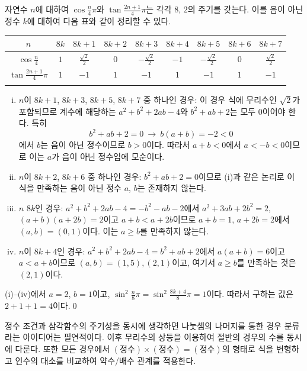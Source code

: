 \documentclass{article}
\begin{document}
\begin{sol}
	자연수 $n$에 대하여 $\cos\frac{n}{4}\pi$와 $\tan\frac{2n+1}{4}\pi$는 각각 $8$, $2$의 주기를 갖는다. 이를 음이 아닌 정수 $k$에 대하여 다음 표와 같이 정리할 수 있다.
	\begin{table}[H]
		\centering
		\begin{tabular}{c|cccccccc}
			\toprule
			$n$ & $8k$ & $8k+1$ & $8k+2$ & $8k+3$ & $8k+4$ & $8k+5$ & $8k+6$ & $8k+7$ \\ 
			\midrule
			$\cos\frac{n}{4}$ & $1$ & $\frac{\sqrt2}{2}$ & $0$ & $-\frac{\sqrt2}{2}$ & $-1$ & $-\frac{\sqrt2}{2}$ & $0$ & $\frac{\sqrt2}{2}$ \\ \addlinespace[3pt]
			\midrule
			$\tan\frac{2n+1}{4}\pi$ & $1$ & $-1$ & $1$ & $-1$ & $1$ & $-1$ & $1$ & $-1$ \\ \addlinespace[3pt]
			\bottomrule
		\end{tabular}
	\end{table}
	\begin{enumerate}[(i)]
		\item $n$이 $8k+1$, $8k+3$, $8k+5$, $8k+7$ 중 하나인 경우: 이 경우 식에 무리수인 $\sqrt2$가 포함되므로 계수에 해당하는 $a^2+b^2+2ab-4$와 $b^2+ab+2$는 모두 $0$이어야 한다. 특히
			\[
				b^2+ab+2=0~\longrightarrow~b(a+b)=-2<0
			\]
			에서 $b$는 음이 아닌 정수이므로 $b>0$이다. 따라서 $a+b<0$에서 $a<-b<0$이므로 이는 $a$가 음이 아닌 정수임에 모순이다.
		\item $n$이 $8k+2$, $8k+6$ 중 하나인 경우: $b^2+ab+2=0$이므로 (i)과 같은 논리로 이 식을 만족하는 음이 아닌 정수 $a$, $b$는 존재하지 않는다.
		\item $n$ $8k$인 경우: $a^2+b^2+2ab-4=-b^2-ab-2$에서 $a^2+3ab+2b^2=2$, $(a+b)(a+2b)=2$이고 $a+b<a+2b$이므로 $a+b=1$, $a+2b=2$에서 $(a,b)=(0,1)$이다. 이는 $a\geq b$를 만족하지 않는다.
		\item $n$이 $8k+4$인 경우: $a^2+b^2+2ab-4=b^2+ab+2$에서 $a(a+b)=6$이고 $a<a+b$이므로 $(a,b)=(1,5),(2,1)$이고, 여기서 $a\geq b$를 만족하는 것은 $(2,1)$이다.
	\end{enumerate}
	(i)--(iv)에서 $a=2$, $b=1$이고, $\sin^2\frac{n}{8}\pi=\sin^2\frac{8k+4}{8}\pi=1$이다. 따라서 구하는 값은 $2+1+1=4$이다.\qed
\end{sol}

\begin{remark}[참고]
	정수 조건과 삼각함수의 주기성을 동시에 생각하면 나눗셈의 나머지를 통한 경우 분류라는 아이디어는 필연적이다. 이후 무리수의 상등을 이용하여 절반의 경우의 수를 동시에 다룬다. 또한 모든 경우에서 $(\text{정수})\times(\text{정수})=(\text{정수})$의 형태로 식을 변형하고 인수의 대소를 비교하여 약수/배수 관계를 적용한다.
\end{remark}
\end{document}

